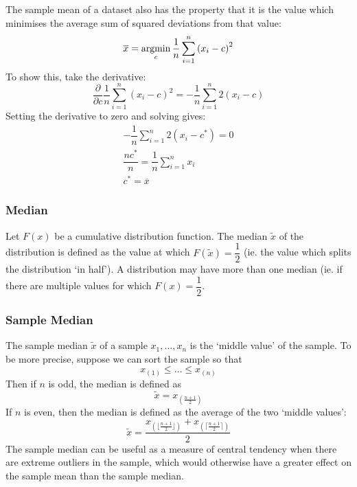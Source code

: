 \documentclass[11pt]{report} %
\begin{document}
The sample mean of a dataset also has the property that it is the value which minimises the average sum of squared deviations from that value:
\begin{equation}
\overline{x} = \operatorname*{argmin}_{c}\dfrac{1}{n}\sum_{i = 1}^{n}\left(x_{i} - c\right)^{2}
\end{equation}
To show this, take the derivative:
\begin{equation}
\dfrac{\partial}{\partial c}\dfrac{1}{n}\sum_{i = 1}^{n}\left(x_{i} - c\right)^{2} = -\dfrac{1}{n}\sum_{i = 1}^{n}2\left(x_{i} - c\right)
\end{equation}
Setting the derivative to zero and solving gives:
\begin{gather}
-\dfrac{1}{n}\sum_{i = 1}^{n}2\left(x_{i} - c^{*}\right) = 0 \\
\dfrac{nc^{*}}{n} = \dfrac{1}{n}\sum_{i = 1}^{n}x_{i} \\
c^{*} = \overline{x}
\end{gather}

\subsubsection{Median}

Let $F\left(x\right)$ be a cumulative distribution function. The median $\widetilde{x}$ of the distribution is defined as the value at which $F\left(\widetilde{x}\right) = \dfrac{1}{2}$ (ie. the value which splits the distribution `in half'). A distribution may have more than one median (ie. if there are multiple values for which $F\left(x\right) = \dfrac{1}{2}$.

\subsubsection{Sample Median}

The sample median $\widetilde{x}$ of a sample $x_{1}, \dots, x_{n}$ is the `middle value' of the sample. To be more precise, suppose we can sort the sample so that
\begin{equation}
x_{\left(1\right)} \leq \dots \leq x_{\left(n\right)}
\end{equation}
Then if $n$ is odd, the median is defined as
\begin{equation}
\widetilde{x} = x_{\left(\frac{n + 1}{2}\right)}
\end{equation}
If $n$ is even, then the median is defined as the average of the two `middle values':
\begin{equation}
\widetilde{x} = \dfrac{x_{\left(\lfloor\frac{n + 1}{2}\rfloor\right)} + x_{\left(\lceil\frac{n + 1}{2}\rceil\right)}}{2}
\end{equation}
The sample median can be useful as a measure of central tendency when there are extreme outliers in the sample, which would otherwise have a greater effect on the sample mean than the sample median.
\end{document}
